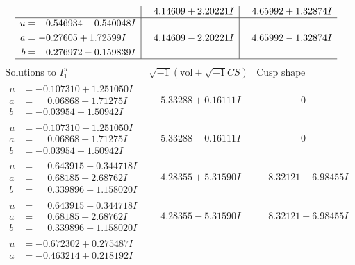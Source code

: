 \documentclass[1p]{elsarticle_modified}
\theoremstyle{definition}
\newcommand{\I}{\sqrt{-1}}
\begin{document}
$$\begin{array}{c|c|c}
 & \phantom{-}4.14609 + 2.20221 I & \phantom{-}4.65992 + 1.32874 I \\ \hline\begin{aligned}
u &= -0.546934 - 0.540048 I \\
a &= -0.27605 + 1.72599 I \\
b &= \phantom{-}0.276972 - 0.159839 I\end{aligned}
 & \phantom{-}4.14609 - 2.20221 I & \phantom{-}4.65992 - 1.32874 I\\
 \hline 
 \end{array}$$\newpage$$\begin{array}{c|c|c}  
\text{Solutions to }I^u_{1}& \I (\text{vol} + \sqrt{-1}CS) & \text{Cusp shape}\\
 \hline 
\begin{aligned}
u &= -0.107310 + 1.251050 I \\
a &= \phantom{-}0.06868 - 1.71275 I \\
b &= -0.03954 + 1.50942 I\end{aligned}
 & \phantom{-}5.33288 + 0.16111 I & \phantom{-0.000000 } 0 \\ \hline\begin{aligned}
u &= -0.107310 - 1.251050 I \\
a &= \phantom{-}0.06868 + 1.71275 I \\
b &= -0.03954 - 1.50942 I\end{aligned}
 & \phantom{-}5.33288 - 0.16111 I & \phantom{-0.000000 } 0 \\ \hline\begin{aligned}
u &= \phantom{-}0.643915 + 0.344718 I \\
a &= \phantom{-}0.68185 + 2.68762 I \\
b &= \phantom{-}0.339896 - 1.158020 I\end{aligned}
 & \phantom{-}4.28355 + 5.31590 I & \phantom{-}8.32121 - 6.98455 I \\ \hline\begin{aligned}
u &= \phantom{-}0.643915 - 0.344718 I \\
a &= \phantom{-}0.68185 - 2.68762 I \\
b &= \phantom{-}0.339896 + 1.158020 I\end{aligned}
 & \phantom{-}4.28355 - 5.31590 I & \phantom{-}8.32121 + 6.98455 I \\ \hline\begin{aligned}
u &= -0.672302 + 0.275487 I \\
a &= -0.463214 + 0.218192 I \\

\end{aligned}
\end{array}$$
\end{document}

